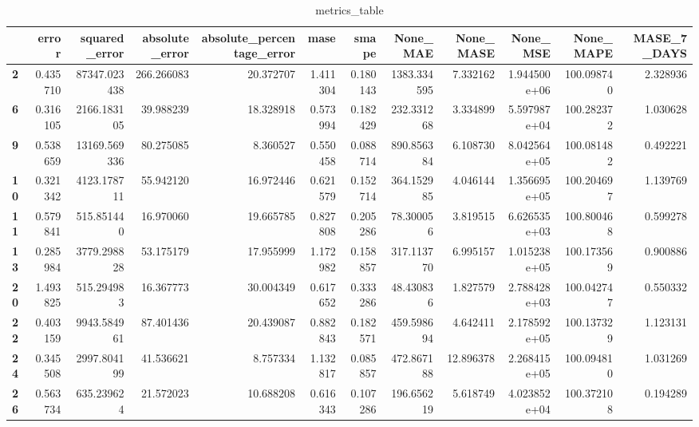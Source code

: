 \begin{table}[h]
\centering
\caption{metrics_table}
\label{table:Experiment with CNN AE and LSTM hybrid method. Local, multivariate, dataset 1. Tuned with LSTM Local Multivariate dataset 1}
\begin{tabular}{lrrrrrrrrrrr}
\toprule
{} &     error &  squared\_error &  absolute\_error &  absolute\_percentage\_error &      mase &     smape &     None\_MAE &  None\_MASE &      None\_MSE &   None\_MAPE &  MASE\_7\_DAYS \\
\midrule
\textbf{2 } &  0.435710 &   87347.023438 &      266.266083 &                  20.372707 &  1.411304 &  0.180143 &  1383.334595 &   7.332162 &  1.944500e+06 &  100.098740 &     2.328936 \\
\textbf{6 } &  0.316105 &    2166.183105 &       39.988239 &                  18.328918 &  0.573994 &  0.182429 &   232.331268 &   3.334899 &  5.597987e+04 &  100.282372 &     1.030628 \\
\textbf{9 } &  0.538659 &   13169.569336 &       80.275085 &                   8.360527 &  0.550458 &  0.088714 &   890.856384 &   6.108730 &  8.042564e+05 &  100.081482 &     0.492221 \\
\textbf{10} &  0.321342 &    4123.178711 &       55.942120 &                  16.972446 &  0.621579 &  0.152714 &   364.152985 &   4.046144 &  1.356695e+05 &  100.204697 &     1.139769 \\
\textbf{11} &  0.579841 &     515.851440 &       16.970060 &                  19.665785 &  0.827808 &  0.205286 &    78.300056 &   3.819515 &  6.626535e+03 &  100.800468 &     0.599278 \\
\textbf{13} &  0.285984 &    3779.298828 &       53.175179 &                  17.955999 &  1.172982 &  0.158857 &   317.113770 &   6.995157 &  1.015238e+05 &  100.173569 &     0.900886 \\
\textbf{20} &  1.493825 &     515.294983 &       16.367773 &                  30.004349 &  0.617652 &  0.333286 &    48.430836 &   1.827579 &  2.788428e+03 &  100.042747 &     0.550332 \\
\textbf{22} &  0.403159 &    9943.584961 &       87.401436 &                  20.439087 &  0.882843 &  0.182571 &   459.598694 &   4.642411 &  2.178592e+05 &  100.137329 &     1.123131 \\
\textbf{24} &  0.345508 &    2997.804199 &       41.536621 &                   8.757334 &  1.132817 &  0.085857 &   472.867188 &  12.896378 &  2.268415e+05 &  100.094810 &     1.031269 \\
\textbf{26} &  0.563734 &     635.239624 &       21.572023 &                  10.688208 &  0.616343 &  0.107286 &   196.656219 &   5.618749 &  4.023852e+04 &  100.372108 &     0.194289 \\

\end{tabular}
\end{table}
